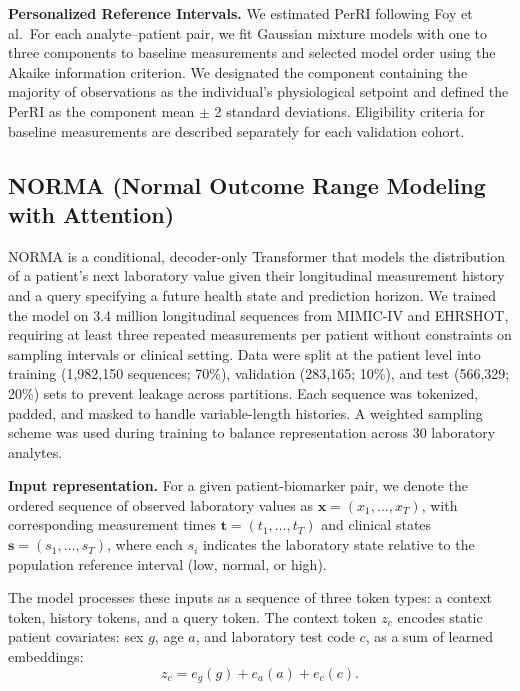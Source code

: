 \documentclass[11pt]{article}
\begin{document}
\textbf{Personalized Reference Intervals.} We estimated PerRI following Foy et al.\ For each analyte--patient pair, we fit Gaussian mixture models with one to three components to baseline measurements and selected model order using the Akaike information criterion. We designated the component containing the majority of observations as the individual's physiological setpoint and defined the PerRI as the component mean $\pm$ 2 standard deviations. Eligibility criteria for baseline measurements are described separately for each validation cohort.

\subsection*{NORMA (Normal Outcome Range Modeling with Attention)}

NORMA is a conditional, decoder-only Transformer that models the distribution of a patient's next laboratory value given their longitudinal measurement history and a query specifying a future health state and prediction horizon. We trained the model on 3.4 million longitudinal sequences from MIMIC-IV and EHRSHOT, requiring at least three repeated measurements per patient without constraints on sampling intervals or clinical setting. Data were split at the patient level into training (1,982,150 sequences; 70\%), validation (283,165; 10\%), and test (566,329; 20\%) sets to prevent leakage across partitions. Each sequence was tokenized, padded, and masked to handle variable-length histories. A weighted sampling scheme was used during training to balance representation across 30 laboratory analytes.

\textbf{Input representation.} For a given patient-biomarker pair, we denote the ordered sequence of observed laboratory values as $\mathbf{x} = (x_1, \ldots, x_T)$, with corresponding measurement times $\mathbf{t} = (t_1, \ldots, t_T)$ and clinical states $\mathbf{s} = (s_1, \ldots, s_T)$, where each $s_i$ indicates the laboratory state relative to the population reference interval (low, normal, or high).

The model processes these inputs as a sequence of three token types: a context token, history tokens, and a query token. The context token $z_c$ encodes static patient covariates: sex $g$, age $a$, and laboratory test code $c$, as a sum of learned embeddings:
\begin{equation}
z_c = e_g(g) + e_a(a) + e_c(c).
\end{equation}
\end{document}
